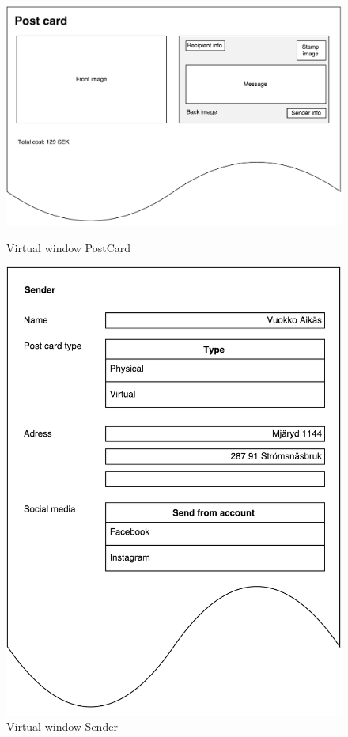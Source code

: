 \documentclass[10pt,a4paper]{article}
\begin{document}
\begin{centering}
\begin{figure}[!ht]
\begin{minipage}{0.3\textwidth}
\includegraphics[width=\linewidth]{Data_figures/virtualwindows_postcard.pdf}
\caption{Virtual window PostCard}
\label{fig:virtualwindows_postcard}
\end{minipage}\hfill

\begin{minipage}{0.3\textwidth}
\includegraphics[width=\linewidth]{Data_figures/virtualwindows_sender.pdf}
\caption{Virtual window Sender}
\label{fig:virtualwindows_sender}
\end{minipage}\hfill


\end{figure}
\end{centering}
\end{document}
